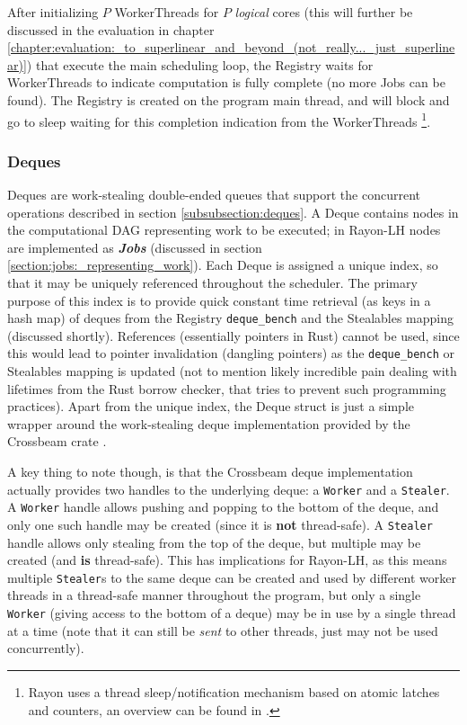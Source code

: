 \documentclass[bsc,frontabs,singlespacing,parskip,deptreport,normalheadings]{infthesis}
\begin{document}
After initializing \(P\) WorkerThreads for \(P\) \textit{logical} cores (this
will further be discussed in the evaluation in chapter
\ref{chapter:evaluation:_to_superlinear_and_beyond_(not_really..._just_superlinear)})
that execute the main scheduling loop, the Registry waits for WorkerThreads to
indicate computation is fully complete (no more Jobs can be found). The Registry
is created on the program main thread, and will block and go to sleep waiting
for this completion indication from the WorkerThreads \footnote{Rayon uses a
thread sleep/notification mechanism based on atomic latches and counters, an
overview can be found in \cite{noauthor_rayon-sleep_2022}.}.

\subsubsection*{Deques}
\label{subsubsection:deque_component}

Deques are work-stealing double-ended queues that support the concurrent
operations described in section \ref{subsubsection:deques}. A Deque contains
nodes in the computational DAG representing work to be executed; in Rayon-LH
nodes are implemented as \textit{\textbf{Jobs}} (discussed in section
\ref{section:jobs:_representing_work}). Each Deque is assigned a unique index,
so that it may be uniquely referenced throughout the scheduler. The primary
purpose of this index is to provide quick constant time retrieval (as keys in a
hash map) of deques from the Registry \texttt{deque\_bench} and the Stealables
mapping (discussed shortly). References (essentially pointers in Rust) cannot be
used, since this would lead to pointer invalidation (dangling pointers) as the
\texttt{deque\_bench} or Stealables mapping is updated (not to mention likely
incredible pain dealing with lifetimes from the Rust borrow checker, that tries
to prevent such programming practices). Apart from the unique index, the Deque
struct is just a simple wrapper around the work-stealing deque implementation
provided by the Crossbeam crate \cite{noauthor_crossbeam_2022}.

A key thing to note though, is that the Crossbeam deque implementation actually
provides two handles to the underlying deque: a \texttt{Worker} and a
\texttt{Stealer}. A \texttt{Worker} handle allows pushing and popping to the
bottom of the deque, and only one such handle may be created (since it is
\textbf{not} thread-safe). A \texttt{Stealer} handle allows only stealing from
the top of the deque, but multiple may be created (and \textbf{is} thread-safe).
This has implications for Rayon-LH, as this means multiple \texttt{Stealer}s to
the same deque can be created and used by different worker threads in a
thread-safe manner throughout the program, but only a single \texttt{Worker}
(giving access to the bottom of a deque) may be in use by a single thread at a
time (note that it can still be \textit{sent} to other threads, just may not be
used concurrently).
\end{document}
